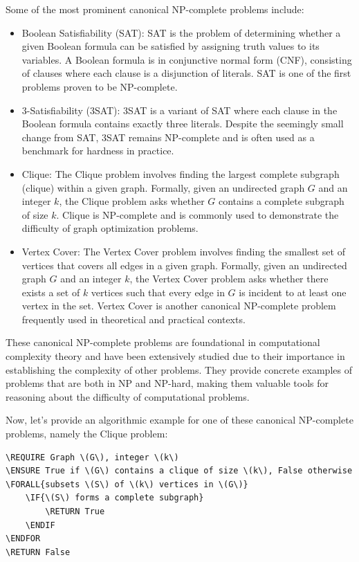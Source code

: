 \documentclass[12pt]{book} %
\begin{document}
Some of the most prominent canonical NP-complete problems include:
\begin{itemize}
    \item Boolean Satisfiability (SAT): SAT is the problem of determining whether a given Boolean formula can be satisfied by assigning truth values to its variables. A Boolean formula is in conjunctive normal form (CNF), consisting of clauses where each clause is a disjunction of literals. SAT is one of the first problems proven to be NP-complete.

\item 3-Satisfiability (3SAT): 3SAT is a variant of SAT where each clause in the Boolean formula contains exactly three literals. Despite the seemingly small change from SAT, 3SAT remains NP-complete and is often used as a benchmark for hardness in practice.

\item Clique: The Clique problem involves finding the largest complete subgraph (clique) within a given graph. Formally, given an undirected graph \(G\) and an integer \(k\), the Clique problem asks whether \(G\) contains a complete subgraph of size \(k\). Clique is NP-complete and is commonly used to demonstrate the difficulty of graph optimization problems.

\item Vertex Cover: The Vertex Cover problem involves finding the smallest set of vertices that covers all edges in a given graph. Formally, given an undirected graph \(G\) and an integer \(k\), the Vertex Cover problem asks whether there exists a set of \(k\) vertices such that every edge in \(G\) is incident to at least one vertex in the set. Vertex Cover is another canonical NP-complete problem frequently used in theoretical and practical contexts.
\end{itemize}


These canonical NP-complete problems are foundational in computational complexity theory and have been extensively studied due to their importance in establishing the complexity of other problems. They provide concrete examples of problems that are both in NP and NP-hard, making them valuable tools for reasoning about the difficulty of computational problems.

Now, let's provide an algorithmic example for one of these canonical NP-complete problems, namely the Clique problem:

\begin{lstlisting}[caption={Clique}]
\REQUIRE Graph \(G\), integer \(k\)
\ENSURE True if \(G\) contains a clique of size \(k\), False otherwise
\FORALL{subsets \(S\) of \(k\) vertices in \(G\)}
    \IF{\(S\) forms a complete subgraph}
        \RETURN True
    \ENDIF
\ENDFOR
\RETURN False
\end{lstlisting}
\end{document}
